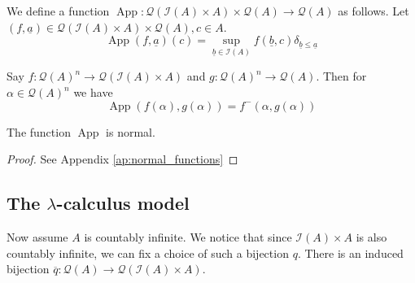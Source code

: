 \documentclass[runningheads]{llncs}
\newcommand{\call}[1]{\mathcal{#1}}
\newcommand{\Ical}{\call{I}}
\newcommand{\Qcal}{\call{Q}}
\newcommand{\lto}{\longrightarrow}
\begin{document}
	\begin{definition}
		We define a function $\operatorname{App}: \Qcal(\Ical(A) \times A) \times \Qcal(A) \lto \Qcal(A)$ as follows. Let $(f, \underline{a}) \in \Qcal(\Ical(A) \times A) \times \Qcal(A), c \in A$.
		\begin{equation}
			\operatorname{App}(f,\underline{a})(c) = \operatorname{sup}_{\underline{b} \in \Ical(A)}f(\underline{b},c)\delta_{\underline{b} \leq \underline{a}}
			\end{equation}
		\end{definition}
	
	\begin{remark}
		Say $f: \Qcal(A)^n \lto \Qcal(\Ical(A) \times A)$ and $g: \Qcal(A)^n \lto \Qcal(A)$. Then for $\alpha \in \Qcal(A)^n$ we have
		\begin{equation}
			\operatorname{App}(f(\alpha), g(\alpha))= f^-(\alpha, g(\alpha))
			\end{equation}
		\end{remark}
	
	\begin{lemma}\label{lem:app_normal}
		The function $\operatorname{App}$ is normal.
	\end{lemma}
 \begin{proof}
     See Appendix \ref{ap:normal_functions}
 \end{proof}
	\subsection{The $\lambda$-calculus model}
	Now assume $A$ is countably infinite. We notice that since $\Ical(A) \times A$ is also countably infinite, we can fix a choice of such a bijection $q$. There is an induced bijection $\overline{q}: \Qcal(A) \lto \Qcal(\Ical(A) \times A)$.
	
\end{document}
